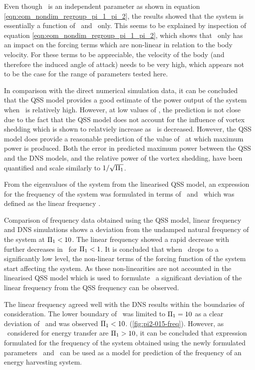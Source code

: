 Even though \mstar\ is an independent parameter as shown in equation \ref{eqn:eom_nondim_regroup_pi_1_pi_2}, the results showed that the system is essentially a function of \massstiff\ and \massdamp\ only.  This seems to be explained by inspection of  equation \ref{eqn:eom_nondim_regroup_pi_1_pi_2}, which shows that \mstar\ only has an impact on the forcing terms which are non-linear in relation to the body velocity. For these terms to be appreciable, the velocity of the body (and therefore the induced angle of attack) needs to be very high, which appears not to be the case for the range of parameters tested here. 

In comparison with the direct numerical simulation data, it can be concluded that the QSS model provides a good estimate of the power output of the system when \massstiff\ is relatively high. However, at low values of \massstiff, the prediction is not close due to the fact that the QSS model does not account for the influence of vortex shedding which is shown to relatviely increase as \massstiff\ is decreased. However, the QSS model does provide a reasonable prediction of the value of \massdamp\ at which maximum power is produced. Both the error in predicted maximum power between the QSS and the DNS models, and the relative power of the vortex shedding, have been quantified and scale similarly to $1/\sqrt{\Pi_1}$.

From the eigenvalues of the system from the linearised QSS model, an expression for the frequency of the system was formulated in terms of \massstiff\ and \massdamp\ which was defined as the linear frequency \freqlin.

Comparison of frequency data obtained using the QSS model, linear frequency and DNS simulations shows a deviation from the undamped natural frequency of the system at $\Pi_1<10$. The linear frequency showed a rapid decrease with further decreases in \massstiff\ for $\Pi_1<1$. It is concluded that when \massstiff\ drops to a significantly low level, the non-linear terms of the forcing function of the system start affecting the system. As these non-linearities are not accounted in the linearised QSS model which is used to formulate \freqlin\ a significant deviation of the linear frequency from the QSS frequency can be observed.

The linear frequency agreed well with the DNS results within the boundaries of consideration. The lower boundary of \massstiff\ was limited to $\Pi_1=10$ as a clear deviation of \freqlin\ and \freqdns was observed $\Pi_1<10$. (\ref{fig:pi2-015-freq}). However, as \massstiff\ considered for energy transfer are $\Pi_1>10$, it can be concluded that expression formulated for the frequency of the system obtained using the newly formulated parameters \massstiff\ and \massdamp\ can be used as a model for prediction of the frequency of an energy harvesting system.  
 
 









